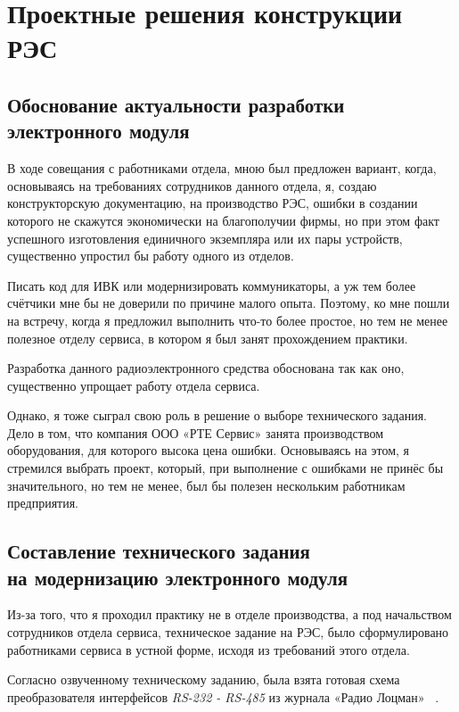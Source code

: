 \section{Проектные решения конструкции РЭС}

\subsection{Обоснование актуальности разработки \\
  электронного модуля}

В ходе совещания с работниками отдела,
мною был предложен вариант,
когда, основываясь на требованиях сотрудников данного
отдела, я, создаю конструкторскую документацию,
на производство РЭС, ошибки в создании которого не скажутся
экономически на благополучии фирмы,
но при этом факт успешного изготовления
единичного экземпляра или их пары устройств,
существенно упростил бы работу одного из отделов.

Писать код для ИВК или модернизировать коммуникаторы,
а уж тем более счётчики мне бы не доверили по причине
малого опыта. Поэтому, ко мне пошли на встречу, когда
я предложил выполнить что-то более простое,
но тем не менее полезное отделу сервиса,
в котором я был занят прохождением практики.


Разработка данного радиоэлектронного средства обоснована
так как оно, существенно упрощает
работу отдела сервиса.

Однако, я тоже сыграл свою роль в решение о выборе технического задания.
Дело в том, что компания ООО «РТЕ Сервис» занята производством
оборудования, для которого высока цена ошибки.
Основываясь на этом,
я стремился выбрать проект,
который,
при выполнение с ошибками не принёс бы значительного,
но тем не менее, был бы полезен нескольким работникам предприятия.

\subsection{Составление технического задания\\
  на модернизацию электронного модуля}

Из-за того, 
что я проходил практику не в отделе производства,
а под начальством сотрудников отдела сервиса,
техническое задание на РЭС,
было сформулировано работниками сервиса
в устной форме, исходя из требований этого отдела.

Согласно озвученному техническому заданию,
была взята готовая схема преобразователя интерфейсов
\textit{RS-232 - RS-485} из
журнала «Радио Лоцман» ~\cite{rlocman-rs-converter}.

